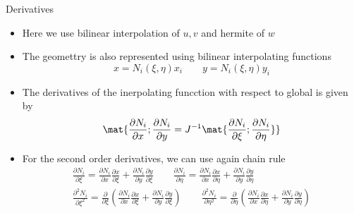 	\begin{frame}{Derivatives}
		\begin{itemize}
			\item Here we use bilinear interpolation of $u,v$ and hermite of $w$
			\item The geomettry is also represented using bilinear interpolating functions
			\begin{equation}
				x = N_i(\xi,\eta)x_i \qquad y = N_i(\xi,\eta) y_i
			\end{equation}
			\item The derivatives of the inerpolating funcction with respect to global is given by
			\begin{equation}
				\mat{\frac{\partial N_i}{\partial x}; \frac{\partial N_i}{\partial y} = J^{-1} 
					\mat{\frac{\partial N_i}{\partial \xi}; \frac{\partial N_i}{\partial \eta}}}
			\end{equation}
			\item For the second order derivatives, we can use again chain rule
			\begin{equation}
			\begin{aligned}
				\frac{\partial N_i}{\partial \xi} = \frac{\partial N_i}{\partial x}\frac{\partial  x}{\partial \xi} + \frac{\partial N_i}{\partial y}\frac{\partial  y}{\partial \xi}
				\qquad
				\frac{\partial N_i}{\partial \eta} = \frac{\partial N_i}{\partial x}\frac{\partial  x}{\partial \eta} + \frac{\partial N_i}{\partial y}\frac{\partial  y}{\partial \eta} \\
				\frac{\partial^2 N_i}{\partial \xi^2} = \frac{\partial }{\partial \xi}\left(\frac{\partial N_i}{\partial x}\frac{\partial  x}{\partial \xi} + \frac{\partial N_i}{\partial y}\frac{\partial  y}{\partial \xi} \right)		\qquad
				\frac{\partial^2 N_i}{\partial \eta^2} = \frac{\partial }{\partial \eta}\left(\frac{\partial N_i}{\partial x}\frac{\partial  x}{\partial \eta} + \frac{\partial N_i}{\partial y}\frac{\partial  y}{\partial \eta} \right)		  
			\end{aligned}
			\end{equation}
		\end{itemize}
	\end{frame}


